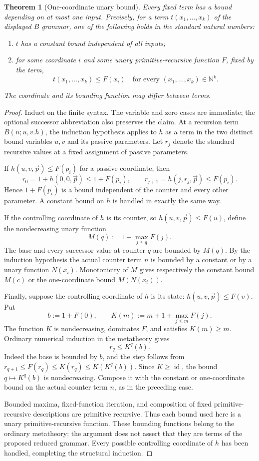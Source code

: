 \documentclass[11pt,letterpaper]{article}
\newtheorem{theorem}{Theorem}[section]
\theoremstyle{definition}\newtheorem{definition}[theorem]{Definition}
\theoremstyle{remark}\newtheorem{remark}[theorem]{Remark}
\begin{document}
\begin{theorem}[One-coordinate unary bound]
\label{seedless:one-coordinate}
Every fixed term has a bound depending on at most one input.
Precisely, for a term $t(x_1,\ldots,x_k)$ of the displayed $B$ grammar,
one of the following holds in the standard natural numbers:
\begin{enumerate}
 \item $t$ has a constant bound independent of all inputs;
 \item for some coordinate $i$ and some unary primitive-recursive
       function $F$, fixed by the term,
       \[
       t(x_1,\ldots,x_k)\le F(x_i)
       \quad\text{for every }(x_1,\ldots,x_k)\in\mathbb N^k.
       \]
\end{enumerate}
The coordinate and its bounding function may differ between terms.
\end{theorem}
\begin{proof}
Induct on the finite syntax. The variable and zero cases are immediate;
the optional successor abbreviation also preserves the claim. At a
recursion term $B(n;u,v.h)$, the induction hypothesis applies to $h$
as a term in the two distinct bound variables $u,v$ and its passive
parameters. Let $r_j$ denote the standard recursive values at a fixed
assignment of passive parameters.

If $h(u,v,\vec p)\le F(p_i)$ for a passive coordinate, then
\[
 r_0=1+h(0,0,\vec p)\le1+F(p_i),\qquad
 r_{j+1}=h(j,r_j,\vec p)\le F(p_i).
\]
Hence $1+F(p_i)$ is a bound independent of the counter and every other
parameter. A constant bound on $h$ is handled in exactly the same way.

If the controlling coordinate of $h$ is its counter, so
$h(u,v,\vec p)\le F(u)$, define the nondecreasing unary function
\[
                       M(q):=1+\max_{j\le q}F(j).
\]
The base and every successor value at counter $q$ are bounded by
$M(q)$. By the induction hypothesis the actual counter term $n$ is
bounded by a constant or by a unary function $N(x_i)$. Monotonicity of
$M$ gives respectively the constant bound $M(c)$ or the one-coordinate
bound $M(N(x_i))$.

Finally, suppose the controlling coordinate of $h$ is its state:
$h(u,v,\vec p)\le F(v)$. Put
\[
 b:=1+F(0),\qquad
 K(m):=m+1+\max_{j\le m}F(j).
\]
The function $K$ is nondecreasing, dominates $F$, and satisfies
$K(m)\ge m$. Ordinary numerical induction in the metatheory gives
\[
                          r_q\le K^q(b).
\]
Indeed the base is bounded by $b$, and the step follows from
$r_{q+1}\le F(r_q)\le K(r_q)\le K(K^q(b))$.
Since $K\ge\operatorname{id}$, the bound $q\mapsto K^q(b)$ is
nondecreasing. Compose it with the constant or one-coordinate bound
on the actual counter term $n$, as in the preceding case.

Bounded maxima, fixed-function iteration, and composition of fixed
primitive-recursive descriptions are primitive recursive. Thus each
bound used here is a unary primitive-recursive function. These bounding
functions belong to the ordinary metatheory; the argument does not
assert that they are terms of the proposed reduced grammar. Every
possible controlling coordinate of $h$ has been handled, completing
the structural induction.
\end{proof}
\end{document}
